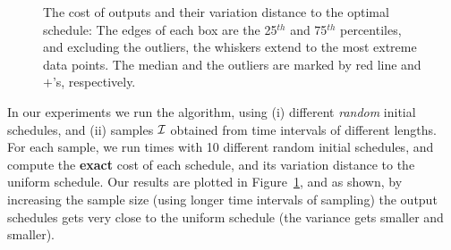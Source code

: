 \begin{figure}[htbp]
	\caption{\scriptsize The cost of \algonameapx outputs and their variation distance to the optimal schedule: 
	The edges of each box are the 25$^{th}$ and 75$^{th}$ percentiles, and excluding the outliers, the whiskers extend to the most extreme data points. The median and the outliers are marked by red line and $+$'s, respectively.
	} \label{fig:unique}
\end{figure}
In our experiments we run the \algonameapx algorithm, using (i) different \emph{random} initial schedules, and (ii) samples $\mathcal{I}$ obtained from time intervals of different lengths. For each sample, we run  times with 10 different random initial schedules, and compute the \textbf{exact} cost of each schedule, and its variation distance to the uniform schedule. Our results are plotted in Figure~\ref{fig:unique}, and as shown, by increasing the sample size (using longer time intervals of sampling) the output schedules gets very close to the uniform schedule (the variance gets smaller and smaller).

